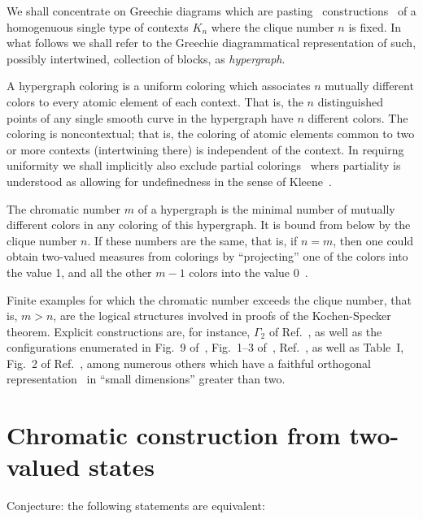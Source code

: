 \documentclass[%
  reprint,
  twocolumn,
 showpacs,
 showkeys,
 preprintnumbers,
 amsmath,amssymb,
 aps,
 pra,
  longbibliography,
 ]{revtex4-1}
\begin{document}
We shall concentrate on Greechie diagrams which are pasting~\cite{Greechie1968} constructions~\cite[Chapter~2]{greechie-66-PhD}
of a homogenuous  single type
of contexts $K_n$
where the clique number $n$ is fixed.
In what follows we shall refer to the Greechie diagrammatical representation of
such, possibly intertwined, collection of blocks, as {\em hypergraph}.

A hypergraph coloring is a uniform coloring which associates $n$ mutually different colors
to every atomic element of each context.
That is, the $n$ distinguished points of any single smooth curve in the hypergraph have $n$ different colors.
The coloring is noncontextual; that is, the coloring of atomic elements common to two or more contexts (intertwining there)
is independent of the context.
In requirng uniformity we shall implicitly also exclude partial colorings~\cite{Abbott:2010uq,PhysRevA.89.032109,2015-AnalyticKS}
whers partiality is understood as allowing for undefinedness in the sense of Kleene~\cite{Kleene1936}.

The chromatic number $m$ of a hypergraph is the minimal number of mutually different colors in any coloring of this hypergraph.
It is bound from below by the clique number $n$.
If these numbers are the same, that is, if $n=m$, then one could obtain two-valued measures from colorings by ``projecting''
one of the colors into the value 1, and all the other $m-1$ colors into the value 0~\cite{godsil-zaks,meyer:99,havlicek-2000}.


Finite examples for which the chromatic number exceeds the clique number, that is, $m>n$,
are the logical structures involved in proofs of the Kochen-Specker theorem.
Explicit constructions are, for instance,
$\Gamma_2$ of Ref.~\cite{kochen1},
as well as the configurations enumerated in
Fig.~9 of~\cite{svozil-tkadlec},
Fig.~1--3 of~\cite{tkadlec-00},
Ref.~\cite{cabello-96},
as well as Table~I, Fig.~2 of Ref.~\cite{2015-AnalyticKS},
among numerous others
which have a faithful orthogonal representation~\cite{lovasz-79,lovasz-89,Portillo-2015}
in ``small dimensions'' greater than two.





\section{Chromatic construction from two-valued states}


Conjecture: the following statements are equivalent:
\end{document}
